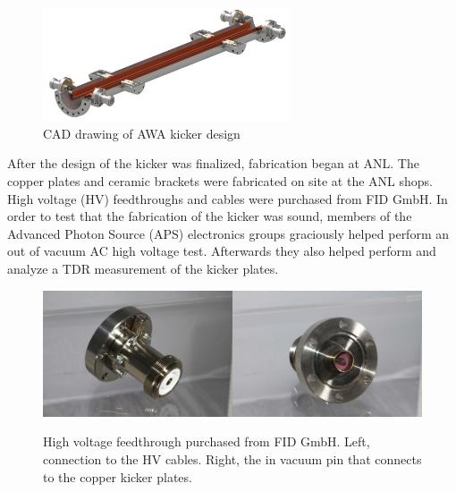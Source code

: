 \begin{figure}%
	\begin{center}
		\includegraphics[width=0.65\textwidth]{./images/kicker}\caption{CAD drawing of AWA kicker design }
		\label{fig:AWAkicker}
	\end{center}
\end{figure}
After the design of the kicker was finalized, fabrication began at ANL.
The copper plates and ceramic brackets were fabricated on site at the ANL shops.
High voltage (HV) feedthroughs and cables were purchased from FID GmbH. 
In order to test that the fabrication of the kicker was sound, members of the 
Advanced Photon Source (APS) electronics groups graciously helped perform an 
out of vacuum AC high voltage test. Afterwards they also helped perform and 
analyze a TDR measurement of the kicker plates. 
\begin{figure}%
	\begin{center}
		\includegraphics[width=0.5\textwidth]{./images/FID_feedthrough1}\includegraphics[width=0.5\textwidth]{./images/FID_feedthrough2}
		\caption{High voltage feedthrough purchased from FID GmbH. Left, connection to the HV cables.
		Right, the in vacuum pin that connects to the copper kicker plates.}
		\label{fig:feedthroughs}
	\end{center}
\end{figure}


